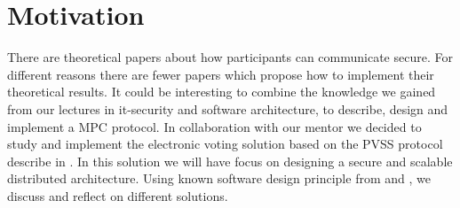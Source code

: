 \section{Motivation} There are theoretical papers about how participants can communicate secure. For different reasons there are fewer papers which propose how to implement their theoretical results. It could be interesting to combine the knowledge we gained from our lectures in it-security and software architecture, to describe, design and implement a MPC protocol. In collaboration with our mentor we decided to study and implement the electronic voting solution based on the PVSS protocol describe in \cite{Schoenmakers1999}. In this solution we will have focus on designing a secure and scalable distributed architecture. Using known software design principle from \cite{Bass} and \cite{Baerbak10}, we discuss and reflect on different solutions.